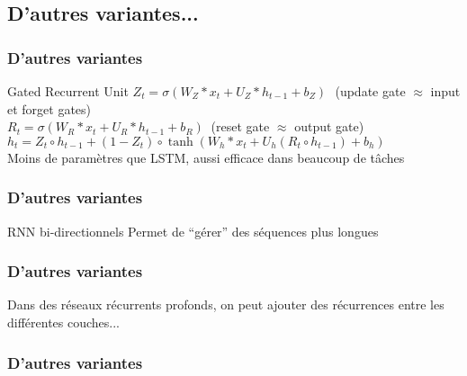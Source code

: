 \subsection{D'autres variantes...}



\begin{frame}
  \frametitle{D'autres variantes}
  Gated Recurrent Unit
  $Z_{t}=\sigma (W_{Z}*x_{t}+U_{Z}*h_{t-1}+b_{Z})\,\,\,\,$(update gate $\approx$ input et forget gates) \\
  $R_{t}=\sigma (W_{R}*x_{t}+U_{R}*h_{t-1}+b_{R})\;\;$(reset gate $\approx$ output gate) \\
  $h_{t}=Z_{t}\circ h_{t-1}+(1-Z_{t})\circ \tanh(W_{h}*x_{t}+U_{h}(R_{t}\circ h_{t-1})+b_{h})$ \\
  Moins de paramètres que LSTM, aussi efficace dans beaucoup de tâches
\end{frame}

\begin{frame}
  \frametitle{D'autres variantes}
  RNN bi-directionnels
  Permet de ``gérer'' des séquences plus longues
\end{frame}

\begin{frame}
  \frametitle{D'autres variantes}
  Dans des réseaux récurrents profonds, on peut ajouter des récurrences entre les différentes couches... \\
\end{frame}

\begin{frame}
  \frametitle{D'autres variantes}
\end{frame}

